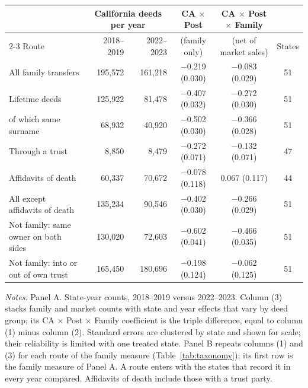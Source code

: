 \begin{table}[htbp]
{\begin{tabular}{lrrccc}
      \midrule
       & \multicolumn{2}{c}{California deeds per year} & CA $\times$ Post & CA $\times$ Post $\times$ Family & \\
      \cmidrule(lr){2-3}
      Route & 2018--2019 & 2022--2023 & (family only) & (net of market sales) & States \\
      \midrule
      All family transfers & 195,572 & 161,218 & $-$0.219 (0.030) & $-$0.083 (0.029) & 51 \\
      Lifetime deeds & 125,922 & 81,478 & $-$0.407 (0.032) & $-$0.272 (0.030) & 51 \\
      \quad of which same surname & 68,932 & 40,920 & $-$0.502 (0.030) & $-$0.366 (0.028) & 51 \\
      Through a trust & 8,850 & 8,479 & $-$0.272 (0.071) & $-$0.132 (0.071) & 47 \\
      Affidavits of death & 60,337 & 70,672 & $-$0.078 (0.118) & 0.067 (0.117) & 44 \\
      All except affidavits of death & 135,234 & 90,546 & $-$0.402 (0.030) & $-$0.266 (0.029) & 51 \\
      Not family: same owner on both sides & 130,020 & 72,603 & $-$0.602 (0.041) & $-$0.466 (0.035) & 51 \\
      Not family: into or out of own trust & 165,450 & 180,696 & $-$0.198 (0.124) & $-$0.062 (0.125) & 51 \\
      \midrule \midrule
   \end{tabular}}
   \par\vspace{2pt}\begin{minipage}{0.95\textwidth}\scriptsize
   \textit{Notes:} Panel A. State-year counts, 2018--2019 versus 2022--2023. Column (3) stacks family and market counts with state and year effects that vary by deed group; its CA $\times$ Post $\times$ Family coefficient is the triple difference, equal to column (1) minus column (2). Standard errors are clustered by state and shown for scale; their reliability is limited with one treated state. Panel B repeats columns (1) and (3) for each route of the family measure (Table~\ref{tab:taxonomy}); its first row is the family measure of Panel A. A route enters with the states that record it in every year compared. Affidavits of death include those with a trust party.
   \end{minipage}
\end{table}


